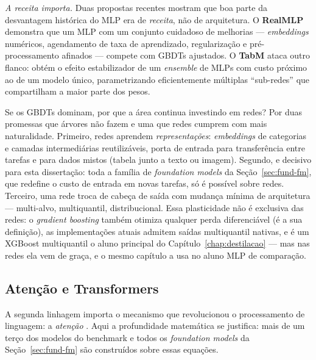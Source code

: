 \emph{A receita importa.} Duas propostas recentes
mostram que boa parte da desvantagem histórica do MLP era de \emph{receita},
não de arquitetura. O \textbf{RealMLP} \citep{realmlp2024} demonstra que um
MLP com um conjunto cuidadoso de melhorias --- \emph{embeddings} numéricos,
agendamento de taxa de aprendizado, regularização e pré-processamento
afinados --- compete com GBDTs ajustados. O \textbf{TabM} \citep{tabm2025}
ataca outro flanco: obtém o efeito estabilizador de um \emph{ensemble} de
MLPs com custo próximo ao de um modelo único, parametrizando eficientemente
múltiplas ``sub-redes'' que compartilham a maior parte dos pesos.

Se os GBDTs dominam,
por que a área continua investindo em redes? Por duas promessas que
árvores não fazem e uma que redes cumprem com mais naturalidade.
Primeiro, redes aprendem \emph{representações}:
\emph{embeddings} de categorias e camadas intermediárias reutilizáveis,
porta de entrada para transferência entre tarefas e para dados mistos
(tabela junto a texto ou imagem). Segundo, e decisivo para esta
dissertação: toda a família de \emph{foundation models} da
Seção~\ref{sec:fund-fm}, que redefine o custo de entrada em novas
tarefas, só é possível sobre redes. Terceiro, uma rede troca de cabeça
de saída com mudança mínima de arquitetura --- multi-alvo,
multiquantil, distribucional. Essa plasticidade não é exclusiva das
redes: o \emph{gradient boosting} também otimiza qualquer perda
diferenciável (é a sua definição), as implementações atuais admitem
saídas multiquantil nativas, e é um XGBoost multiquantil o aluno
principal do Capítulo~\ref{chap:destilacao} --- mas nas redes ela vem
de graça, e o mesmo capítulo a usa no aluno MLP de comparação.

\subsection{Atenção e Transformers}

A segunda linhagem importa o mecanismo que revolucionou o processamento de
linguagem: a \emph{atenção} \citep{vaswani2017}. Aqui a profundidade matemática se
justifica: mais de um terço dos modelos do benchmark e todos os
\emph{foundation
models} da Seção~\ref{sec:fund-fm} são construídos sobre essas equações.

